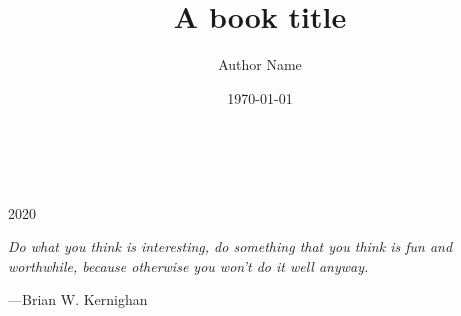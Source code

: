 \documentclass[a5paper,pagesize,8pt,bibtotoc,pointlessnumbers,
normalheadings,DIV=9,twoside=false]{scrbook}
\title{A book title}
\author{Author Name}
\date{\today}
\begin{document}
\begin{titlepage}
		\\
			
		\vspace{10mm}
		\\
		\vspace{\fill}
		\centering \large{2020}
\end{titlepage}


\newpage{}
\thispagestyle {empty}

\vspace*{2cm}

\begin{center}
	\Large{\parbox{10cm}{
		\begin{raggedright}
		{\Large 
			\textit{Do what you think is interesting, 
			do something that you think is fun and worthwhile, 
			because otherwise you won't do it well anyway.}
		}
	
		\vspace{.5cm}\hfill{---Brian W. Kernighan}
		\end{raggedright}
	}
}
\end{center}

\newpage




\end{document}
